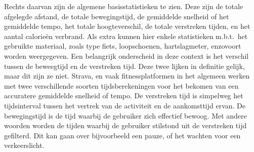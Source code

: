 Rechts daarvan zijn de algemene basisstatistieken te zien. Deze zijn de totale
afgelegde afstand, de totale bewegingstijd, de gemiddelde snelheid of het
gemiddelde tempo, het totale hoogteverschil, de totale verstreken tijden, en
het aantal calorieën verbrand. Als extra kunnen hier enkele statistieken
m.b.t.\ het gebruikte materiaal, zoals type fiets, loopschoenen, hartslagmeter,
enzovoort worden weergegeven. Een belangrijk onderscheid in deze context is het
verschil tussen de beweegtijd en de verstreken tijd. Deze twee lijken in
definitie gelijk, maar dit zijn ze niet. Strava, en vaak fitnessplatformen in
het algemeen werken met twee verschillende soorten tijdsberekeningen voor het
bekomen van een accuratere gemiddelde snelheid of tempo. De verstreken tijd is
simpelweg het tijdsinterval tussen het vertrek van de activiteit en de
aankomsttijd ervan. De bewegingstijd is de tijd waarbij de gebruiker zich
effectief bewoog. Met andere woorden worden de tijden waarbij de gebruiker
stilstond uit de verstreken tijd gefilterd. Dit kan gaan over bijvoorbeeld een
pauze, of het wachten voor een verkeerslicht.

